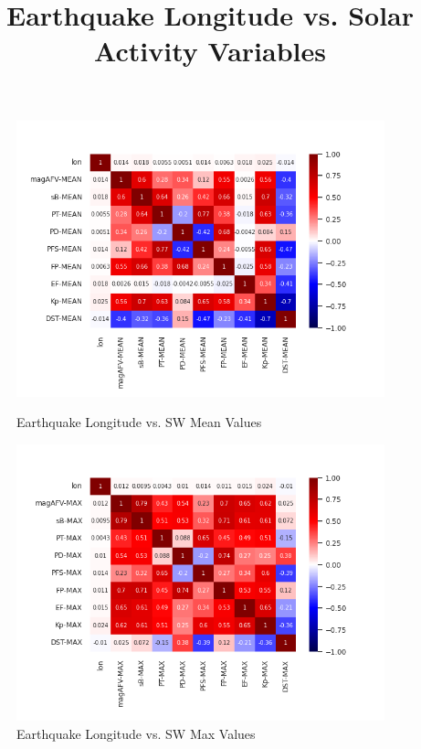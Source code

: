 \documentclass[12pt]{article}
\begin{document}
\begin{figure}
\begin{large}
\title{Earthquake Longitude vs. Solar Activity Variables}
\end{large}
\centering
  \includegraphics[width=0.95\textwidth]{corr-lon-MEAN.png}
  \caption{Earthquake Longitude vs. SW Mean Values}

  \includegraphics[width=0.95\textwidth]{corr-lon-MAX.png}
  \caption{Earthquake Longitude vs. SW Max Values}
\end{figure}

\newpage
\end{document}
